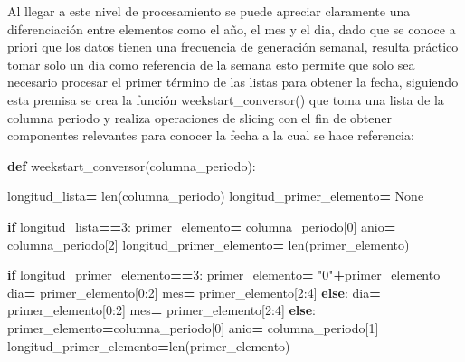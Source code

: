 \documentclass[
]{book}
\newenvironment{Shaded}{\begin{snugshade}}{\end{snugshade}}
\newcommand{\BuiltInTok}[1]{#1}
\newcommand{\ControlFlowTok}[1]{\textcolor[rgb]{0.13,0.29,0.53}{\textbf{#1}}}
\newcommand{\DecValTok}[1]{\textcolor[rgb]{0.00,0.00,0.81}{#1}}
\newcommand{\KeywordTok}[1]{\textcolor[rgb]{0.13,0.29,0.53}{\textbf{#1}}}
\newcommand{\NormalTok}[1]{#1}
\newcommand{\OperatorTok}[1]{\textcolor[rgb]{0.81,0.36,0.00}{\textbf{#1}}}
\newcommand{\StringTok}[1]{\textcolor[rgb]{0.31,0.60,0.02}{#1}}
\newcommand{\VariableTok}[1]{\textcolor[rgb]{0.00,0.00,0.00}{#1}}
\begin{document}
Al llegar a este nivel de procesamiento se puede apreciar claramente una diferenciación entre elementos como el año, el mes y el dia, dado que se conoce a priori que los datos tienen una frecuencia de generación semanal, resulta práctico tomar solo un dia como referencia de la semana esto permite que solo sea necesario procesar el primer término de las listas para obtener la fecha, siguiendo esta premisa se crea la función weekstart\_conversor() que toma una lista de la columna periodo y realiza operaciones de slicing con el fin de obtener componentes relevantes para conocer la fecha a la cual se hace referencia:

\begin{Shaded}
\begin{Highlighting}[]

\KeywordTok{def}\NormalTok{ weekstart\_conversor(columna\_periodo):}
    
\NormalTok{    longitud\_lista}\OperatorTok{=} \BuiltInTok{len}\NormalTok{(columna\_periodo)}
\NormalTok{    longitud\_primer\_elemento}\OperatorTok{=} \VariableTok{None}
    
    \ControlFlowTok{if}\NormalTok{ longitud\_lista}\OperatorTok{==}\DecValTok{3}\NormalTok{:}
\NormalTok{        primer\_elemento}\OperatorTok{=}\NormalTok{ columna\_periodo[}\DecValTok{0}\NormalTok{]}
\NormalTok{        anio}\OperatorTok{=}\NormalTok{ columna\_periodo[}\DecValTok{2}\NormalTok{]}
\NormalTok{        longitud\_primer\_elemento}\OperatorTok{=} \BuiltInTok{len}\NormalTok{(primer\_elemento)}
        
        \ControlFlowTok{if}\NormalTok{ longitud\_primer\_elemento}\OperatorTok{==}\DecValTok{3}\NormalTok{:}
\NormalTok{            primer\_elemento}\OperatorTok{=} \StringTok{"0"}\OperatorTok{+}\NormalTok{primer\_elemento}
\NormalTok{            dia}\OperatorTok{=}\NormalTok{ primer\_elemento[}\DecValTok{0}\NormalTok{:}\DecValTok{2}\NormalTok{]}
\NormalTok{            mes}\OperatorTok{=}\NormalTok{ primer\_elemento[}\DecValTok{2}\NormalTok{:}\DecValTok{4}\NormalTok{]}
        \ControlFlowTok{else}\NormalTok{:}
\NormalTok{            dia}\OperatorTok{=}\NormalTok{ primer\_elemento[}\DecValTok{0}\NormalTok{:}\DecValTok{2}\NormalTok{]}
\NormalTok{            mes}\OperatorTok{=}\NormalTok{ primer\_elemento[}\DecValTok{2}\NormalTok{:}\DecValTok{4}\NormalTok{]}
    \ControlFlowTok{else}\NormalTok{:}
\NormalTok{        primer\_elemento}\OperatorTok{=}\NormalTok{columna\_periodo[}\DecValTok{0}\NormalTok{]}
\NormalTok{        anio}\OperatorTok{=}\NormalTok{ columna\_periodo[}\DecValTok{1}\NormalTok{]}
\NormalTok{        longitud\_primer\_elemento}\OperatorTok{=}\BuiltInTok{len}\NormalTok{(primer\_elemento)}
        

\end{Highlighting}
\end{Shaded}
\end{document}
